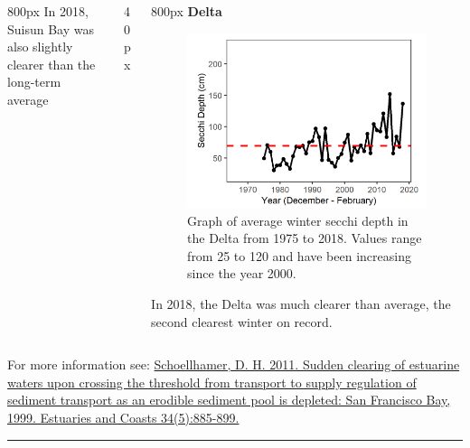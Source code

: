 \documentclass[
]{book}
\begin{document}
\begin{columns}[T]
\begin{column}{800px\textwidth}
In 2018, Suisun Bay was also slightly clearer than the long-term average
\end{column}

\begin{column}{40px\textwidth}
~
\end{column}

\begin{column}{800px\textwidth}
\textbf{Delta}

\begin{figure}
\includegraphics[width=15.25in]{figures/secchi_dtwinter} \caption{Graph of average winter secchi depth in the Delta from 1975 to 2018. Values range from 25 to 120 and have been increasing since the year 2000.}\label{fig:unnamed-chunk-148}
\end{figure}

In 2018, the Delta was much clearer than average, the second clearest winter on record.
\end{column}
\end{columns}

\begin{disclaimer}
For more information see:
\href{https://link.springer.com/article/10.1007/s12237-011-9382-x}{Schoellhamer,
D. H. 2011. Sudden clearing of estuarine waters upon crossing the
threshold from transport to supply regulation of sediment transport as
an erodible sediment pool is depleted: San Francisco Bay, 1999.
Estuaries and Coasts 34(5):885-899.}
\end{disclaimer}

\begin{center}\rule{0.5\linewidth}{0.5pt}\end{center}
\end{document}
